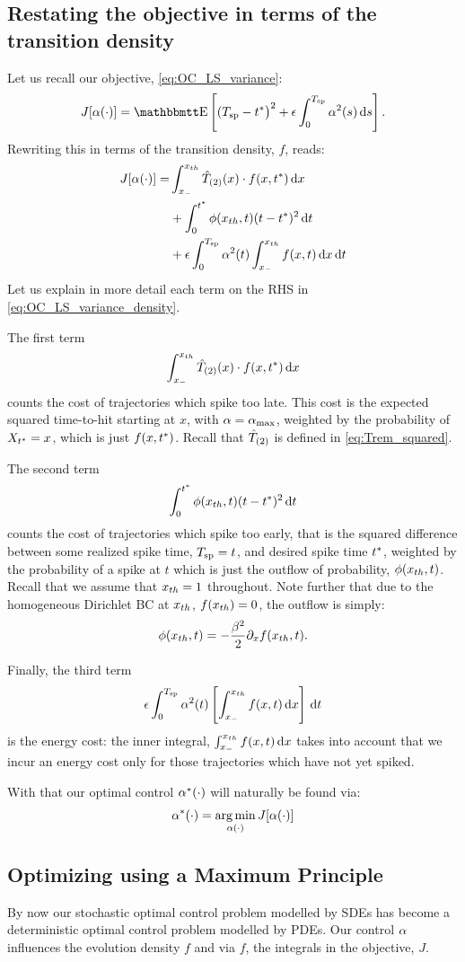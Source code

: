 \documentclass{article}
\begin{document}
\subsection{Restating the objective in terms of the transition density}
Let us recall our objective, \cref{eq:OC_LS_variance}: 
$$
J[\a(\cdot)] = \Exp\left[
(\ts - \T \big)^2
+
\e \int_0^\ts  \a^2(s) \intd{s}
\right].
$$
Rewriting this in terms of the transition density, $f$, reads:
\begin{align}
J[{\alpha}(\cdot)] =&
\int_{ x_{-} }^{ x_{th} } { \hat{T}_{(2)} }(x) \cdot f(x,{ t^* }) \, \mathrm{d} x
\notag
\\
&+ \int_0^{ t^* } \phi({ x_{th} }, t) (t-{ t^* })^2 \, \mathrm{d} t
\label{eq:OC_LS_variance_density}
\\
&+  {\epsilon} \int_0^{ T_{\textrm{sp} } }  {\alpha}^2(t)  \int_{ x_{-} }^{ x_{th} } f(x,t) \, \mathrm{d} x \, \mathrm{d} t
\notag
\end{align}
Let us explain in more detail each term on the RHS in
\cref{eq:OC_LS_variance_density}.

The first term $$ \int_{ x_{-} }^{ x_{th} } { \hat{T}_{(2)} }(x) \cdot f(x,{ t^* })\, \mathrm{d} x $$ counts the cost of trajectories which spike too late. This cost is the expected
squared time-to-hit starting at $x$, with  ${\alpha} = { {\alpha}_{\textrm{max}} }$, weighted by the
probability of $X_{ t^* } = x$, which is just $f(x,{ t^* })$. Recall that ${ \hat{T}_{(2)} }$ is
defined in \cref{eq:Trem_squared}.

The second term $$ \int_0^{ t^* } \phi({ x_{th} },t) (t-{ t^* })^2 \, \mathrm{d} t $$ counts the cost
of trajectories which spike too early, that is the squared difference between
some realized spike time, ${ T_{\textrm{sp} } } = t$, and desired spike time ${ t^* }$, weighted by
the probability of a spike at $t$ which is just the outflow of probability,
$\phi({ x_{th} },t)$. Recall that we assume that ${ x_{th} } = 1$ throughout. Note further
that due to the homogeneous Dirichlet BC at ${ x_{th} }$, $f({ x_{th} }) = 0$, the outflow
is simply: $$ \phi({ x_{th} }, t) = -\frac{{\beta}^2 }{2} {\partial}_x f({ x_{th} }, t).$$

Finally, the third term
$$
{\epsilon} \int_0^{ T_{\textrm{sp} } }  {\alpha}^2(t)  \left[  \int_{ x_{-} }^{ x_{th} } f(x,t) \, \mathrm{d} x \right] \, \mathrm{d} t
$$
is the energy cost: the inner integral, $\int_{ x_{-} }^{ x_{th} } f(x,t) \, \mathrm{d} x$
takes into account that we incur an energy cost only for those trajectories
which have not yet spiked.

With that our optimal control ${\alpha}^*(\cdot)$ will naturally be found via:
$$
\a^*(\cdot) = \argmin_{\a(\cdot)} J[\a(\cdot)]
$$
 
\subsection{Optimizing using a Maximum Principle}
\label{sec:PDE_max_principle_for_pdf}
By now our stochastic optimal control problem modelled by SDEs
has become a deterministic optimal control problem modelled by PDEs. Our control
${\alpha}$ influences the evolution density $f$ and via $f$, the integrals in the
objective, $J$.
\end{document}
